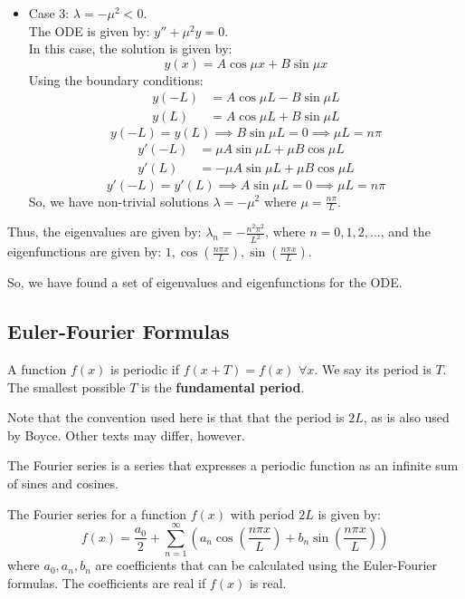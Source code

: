 \begin{eg}
\begin{itemize}
		\item Case 3: $\lambda = -\mu^2 < 0$.\\
		The ODE is given by: $y'' + \mu^2 y = 0$.\\
		In this case, the solution is given by:
		\[
		y(x) = A \cos{\mu x} + B \sin{\mu x}
		\]
		Using the boundary conditions:
		\begin{align*}
			y(-L) & = A \cos{\mu L} - B \sin{\mu L} \\
			y(L) & = A \cos{\mu L} + B \sin{\mu L}
		\end{align*}
		\[
		y(-L) = y(L) \implies B \sin{\mu L} = 0 \implies \mu L = n \pi
		\]
		\begin{align*}
			y'(-L) & = \mu A \sin{\mu L} + \mu B \cos{\mu L} \\
			y'(L) & = -\mu A \sin{\mu L} + \mu B \cos{\mu L}
		\end{align*}
		\[
		y'(-L) = y'(L) \implies A \sin{\mu L} = 0 \implies \mu L = n \pi
		\]
		So, we have non-trivial solutions $\lambda = -\mu^2$ where $\mu = \frac{n \pi}{L}$.
	\end{itemize}
	Thus, the eigenvalues are given by: $\lambda_n = -\frac{n^2\pi^2}{L^2}$, where $n =0, 1, 2, \dots$, and the eigenfunctions are given by: $1, \cos\left(\frac{n\pi x}{L}\right), \sin\left(\frac{n\pi x}{L}\right)$.
	
	So, we have found a set of eigenvalues and eigenfunctions for the ODE.
\end{eg}

\subsection{Euler-Fourier Formulas}

\begin{definition}
	A function $f(x)$ is periodic if $f(x+T) = f(x) \,\, \forall x$. We say its	period is $T$. The smallest possible $T$ is the \textbf{fundamental period}.
\end{definition}

\begin{remark}
	Note that the convention used here is that that the period is $2L$, as is also used by Boyce. Other texts may differ, however.
\end{remark}

The Fourier series is a series that expresses a periodic function as an infinite sum of sines and cosines.
\begin{definition}\label{def:fourier}
	The Fourier series for a function $f(x)$ with period $2L$ is given by: 
	\[
		f(x) = \frac{a_0}{2} + \sum_{n=1}^{\infty} \left(a_n \cos{\left(\frac{n\pi x}{L}\right)} + b_n \sin{\left(\frac{n\pi x}{L}\right)}\right)
	\]
	where $a_0, a_n, b_n$ are coefficients that can be calculated using the Euler-Fourier formulas. The coefficients are real if $f(x)$ is real.
\end{definition}

